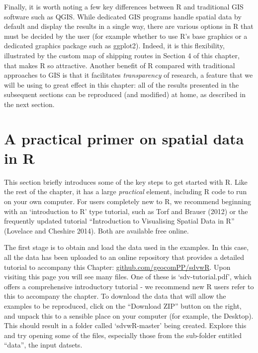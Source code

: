 \documentclass[]{article}
\begin{document}
Finally, it is worth noting a few key differences between R and
traditional GIS software such as QGIS. While dedicated GIS programs
handle spatial data by default and display the results in a single way,
there are various options in R that must be decided by the user (for
example whether to use R's base graphics or a dedicated graphics package
such as ggplot2). Indeed, it is this flexibility, illustrated by the
custom map of shipping routes in Section 4 of this chapter, that makes R
so attractive. Another benefit of R compared with traditional approaches
to GIS is that it facilitates \emph{transparency} of research, a feature
that we will be using to great effect in this chapter: all of the
results presented in the subsequent sections can be reproduced (and
modified) at home, as described in the next section.

\section{A practical primer on spatial data in
R}\label{a-practical-primer-on-spatial-data-in-r}

This section briefly introduces some of the key steps to get started
with R. Like the rest of the chapter, it has a large \emph{practical}
element, including R code to run on your own computer. For users
completely new to R, we recommend beginning with an `introduction to R'
type tutorial, such as Torf and Brauer (2012) or the frequently updated
tutorial ``Introduction to Visualising Spatial Data in R'' (Lovelace and
Cheshire 2014). Both are available free online.

The first stage is to obtain and load the data used in the examples. In
this case, all the data has been uploaded to an online repository that
provides a detailed tutorial to accompany this Chapter:
\href{https://github.com/geocomPP/sdvwR/blob/master/sdv-tutorial.pdf?raw=true}{github.com/geocomPP/sdvwR}.
Upon visiting this page you will see many files. One of these is
`sdv-tutorial.pdf', which offers a comprehensive introductory tutorial -
we recommend new R users refer to this to accompany the chapter. To
download the data that will allow the examples to be reproduced, click
on the ``Download ZIP'' button on the right, and unpack this to a
sensible place on your computer (for example, the Desktop). This should
result in a folder called `sdvwR-master' being created. Explore this and
try opening some of the files, especially those from the sub-folder
entitled ``data'', the input datsets.
\end{document}
